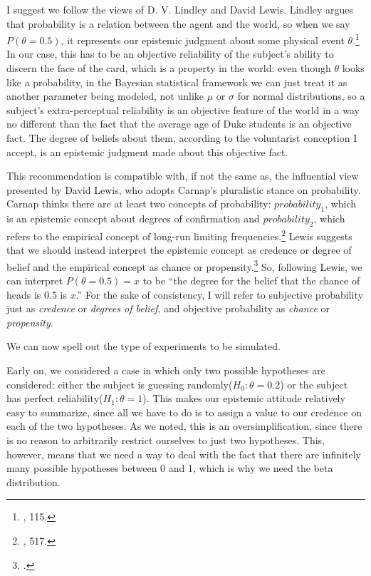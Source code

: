 I suggest we follow the views of D. V. Lindley and David Lewis. Lindley
argues that probability is a relation between the agent and the world,
so when we say \(P(\theta=0.5)\), it represents our epistemic judgment about some physical event \(\theta\).\footnote{\cite{lindleybern}, 115.} In our case, this
has to be an objective reliability of the subject's ability to discern the face of the card, which
is a property in the world: even though \(\theta\) looks like a
probability, in the Bayesian statistical framework we can just treat it
as another parameter being modeled, not unlike \(\mu\) or \(\sigma\) for
normal distributions, so a subject's extra-perceptual reliability is an
objective feature of the world in a way no different than the fact that
the average age of Duke students is an objective fact. The degree of
beliefs about them, according to the voluntarist conception I accept, is an epistemic judgment made about this objective fact.
 
 This recommendation is compatible with, if not the same as, the influential
view presented by David Lewis, who adopts Carnap's pluralistic stance on
probability. Carnap thinks there are at least two concepts of
probability: \(probability_1\), which is an epistemic concept about
degrees of confirmation and \(probability_2\), which refers to the
empirical concept of long-run limiting frequencies.\footnote{\cite{carnapprob}, 517.} Lewis suggests
that we should instead interpret the epistemic concept as credence or
degree of belief and the empirical concept as chance or
propensity.\footnote{\cite{lewisguide}.} So, following Lewis, we can interpret \(P(\theta=0.5)=x\) to
be ``the degree for the belief that the chance of heads is 0.5 is
\(x\).'' For the sake of consistency, I will refer to subjective
probability just as \emph{credence} or \emph{degrees of belief}, and
objective probability as \emph{chance} or \emph{propensity}.

We can now spell out the type of experiments to be simulated.

Early on, we considered a case in which only two possible hypotheses are
considered: either the subject is guessing
randomly(\(H_0:\theta = 0.2\)) or the subject has perfect
reliability(\(H_1:\theta = 1\)). This makes our epistemic attitude
relatively easy to summarize, since all we have to do is to assign a
value to our credence on each of the two hypotheses. As we noted, this
is an oversimplification, since there is no reason to arbitrarily
restrict ourselves to just two hypotheses. This, however, means that we
need a way to deal with the fact that there are infinitely many possible
hypotheses between 0 and 1, which is why we need the beta distribution.

